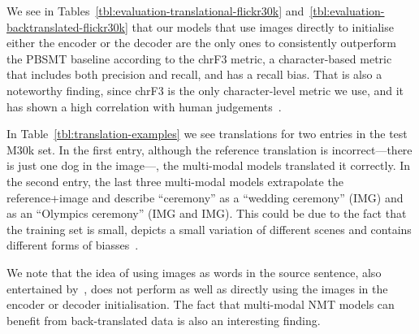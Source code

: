 \documentclass[11pt,twocolumn]{article}
\begin{document}
We see in Tables~\ref{tbl:evaluation-translational-flickr30k} and~\ref{tbl:evaluation-backtranslated-flickr30k} that our models that use images directly to initialise either the encoder or the decoder are the only ones to consistently outperform the PBSMT baseline according to the chrF3 metric, a character-based metric that includes both precision and recall, and has a recall bias.
That is also a noteworthy finding, since chrF3 is the only character-level metric we use, and it has shown a high correlation with human judgements~\cite{Stanojevicetal2015}.

In Table~\ref{tbl:translation-examples} we see translations for two entries in the test M30k set.
In the first entry,
although the reference translation is incorrect---there is just one dog in the image---, the multi-modal models translated it correctly.
In the second entry, the last three multi-modal models extrapolate the reference+image and describe ``ceremony'' as a ``wedding ceremony'' (IMG) and as an ``Olympics ceremony'' (IMG and IMG).
This could be due to the fact that the training set is small, depicts a small variation of different scenes and contains different forms of biasses~\cite{Miltenburg2015}.

We note that the idea of using images as words in the source sentence, also entertained by~, does not perform as well as directly using the images in the encoder or decoder initialisation.
The fact that multi-modal NMT models can benefit from back-translated data
is also an interesting finding.
\end{document}
